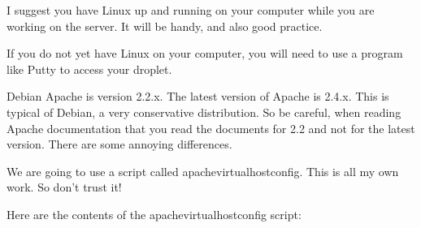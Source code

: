 \documentclass[12pt, a4paper]{article}
\begin{document}
I suggest you have Linux up and running on your computer while you are working on the server. It will be handy, and also good practice.

If you do not yet have Linux on your computer, you will need to use a program like Putty to access your droplet.

Debian Apache is version 2.2.x. The latest  version of Apache is 2.4.x. This is typical of Debian, a very conservative distribution. So be careful, when reading Apache documentation that you read the documents for 2.2 and not for the latest version. There are some annoying differences.

We are going to use a script called apachevirtualhostconfig. This is all my own work. So don’t trust it!

Here are the contents of the apachevirtualhostconfig script:
\end{document}

